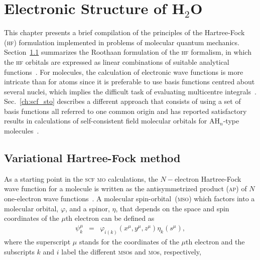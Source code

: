 \chapter{Electronic Structure of H$_{2}$O}
\label{cha:scf_h2o}





This chapter presents a brief compilation of the principles of the
Hartree-Fock (\textsc{hf}) formulation implemented in problems of
molecular quantum mechanics. Section~\ref{ch:var_hf} summarizes the
Roothaan formulation of the \textsc{hf} formalism, in which the
\textsc{hf} orbitals are expressed as linear combinations of suitable
analytical functions~\cite{Roothaan_HF}. For molecules, the
calculation of electronic wave functions is more intricate than for
atoms since it is preferable to use basis functions centred about
several nuclei, which implies the difficult task of evaluating
multicentre
integrals~\cite{Pitzer_1968,Pitzer_1970}. Sec.~\ref{ch:scf_sto}
describes a different approach that consists of using a set of basis
functions all referred to one common origin and has reported
satisfactory results in calculations of self-consistent field
molecular orbitals for AH$_{n}$-type molecules~\cite{Moccia_JCP_2164,
  Moccia_1964}.


\section{Variational Hartree-Fock method}
\label{ch:var_hf}





As a starting point in the \textsc{scf} \textsc{mo} calculations, the
$N-$electron Hartree-Fock wave function for a molecule is written as
the antisymmetrized product (\textsc{ap}) of $N$ one-electron wave
functions~\cite{Roothaan_HF}. A molecular spin-orbital~(\textsc{mso})
which factors into a molecular orbital, $\varphi$, and a spinor,
$\eta$, that depends on the space and spin coordinates of the $\mu$th
electron can be defined as
%
\begin{eqnarray}
  \psi_{k}^{\mu} & = & \varphi_{i(k)}(x^{\mu}, y^{\mu}, z^{\mu})
  \eta_{k}(s^{\mu}),
  \label{eq:mso}
\end{eqnarray}
%
where the superscript $\mu$ stands for the coordinates of the $\mu$th
electron and the subscripts $k$ and $i$ label the different
\textsc{mso}s and \textsc{mo}s, respectively,

